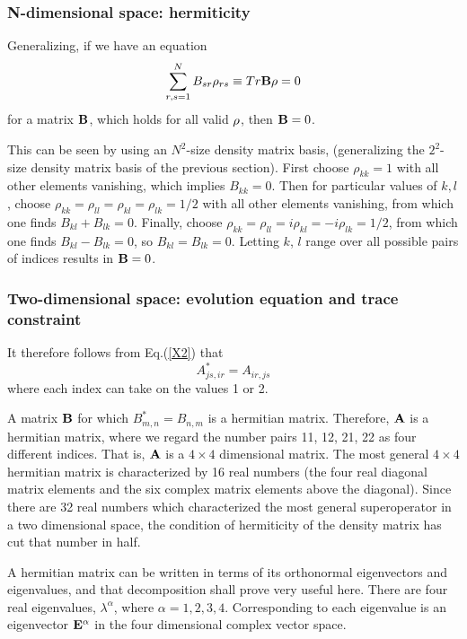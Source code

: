 \documentclass[aps,pra,twocolumn,amssymb, amsfonts,amsmath,showpacs, superscriptaddress]{revtex4}
\begin{document}
\subsubsection{N-dimensional space: hermiticity}

 Generalizing, if we have an equation  
\begin{equation}\label{X3}
\sum_{r,s=1}^{N}B_{sr}\rho_{rs}\equiv Tr{\bf B\rho}=0
\end{equation}
\noindent  for a matrix ${\bf B}$, which holds for all valid ${\bf\rho}$, then ${\bf B}=0$.  


This can be seen by using an $N^{2}$-size density matrix  basis,  (generalizing the $2^{2}$-size density matrix basis of the previous section).  First choose $\rho_{kk}=1$ with all other elements vanishing,   which implies $B_{kk}=0$. Then  for particular values of $k,l$, choose $\rho_{kk}=\rho_{ll}=\rho_{kl}=\rho_{lk}=1/2$ with all other elements vanishing, from which one finds $B_{kl}+B_{lk}=0$. Finally,  choose $\rho_{kk}=\rho_{ll}=i\rho_{kl}=-i\rho_{lk}=1/2$,  from which one  finds $B_{kl}-B_{lk}=0$,   so $B_{kl}=B_{lk}=0$.  Letting $k$, $l$ range over all possible pairs of indices results in ${\bf B}=0$. 

\subsubsection{Two-dimensional space: evolution equation and trace constraint}

It therefore follows from Eq.(\ref{X2}) that 
\[
A_{js,ir}^{*}=A_{ir,js}
\]
\noindent where each index can take on the values 1 or 2. 

A matrix ${\bf B}$ for which $B_{m, n}^{*}=B_{n, m}$ is a hermitian matrix.  Therefore, ${\bf A}$ is a hermitian matrix, where we regard the number pairs  11, 12, 21, 22  as 
four different indices.  That is,  ${\bf A}$ is a $4\times4$ dimensional matrix.  The most general $4\times4$ hermitian  matrix is characterized by 16 real numbers (the four real diagonal matrix elements and the six complex matrix elements above the diagonal).  Since there are 32 real numbers which characterized the most general superoperator in a two dimensional space, the condition of hermiticity of the density matrix has cut that number in half.  

A hermitian matrix can be written in terms of its orthonormal eigenvectors and eigenvalues, and that decomposition shall prove very useful here.  There are four real eigenvalues, 
$\lambda^{\alpha}$, where $\alpha =1, 2, 3, 4$.  Corresponding to each eigenvalue is an eigenvector ${\bf E}^{\alpha}$ in the four dimensional complex vector space.  
\end{document}
